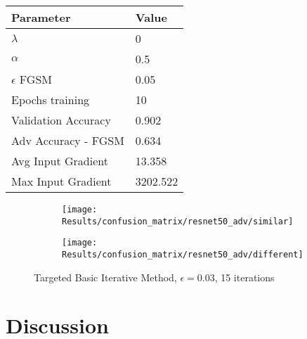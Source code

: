 \documentclass[draft,final]{vutinfth} %
\begin{document}
\begin{table}[h]
  \centering
  \begin{tabular}{ll}
    \toprule
			Parameter			& Value   \\
    \midrule
			$\lambda$								& 0				\\
			$\alpha$								& 0.5				\\
			$\epsilon$ FGSM					& 0.05		\\
			Epochs training					& 10			\\
			
			Validation Accuracy			& 0.902		\\ 
			Adv Accuracy - FGSM			& 0.634		\\
			
			Avg Input Gradient			& 13.358	\\
			Max Input Gradient			& 3202.522\\
    \bottomrule
  \end{tabular}
\end{table}


\begin{figure}[h]
  \begin{subfigure}[b]{0.5\columnwidth}
		\centering
    \texttt{[image: Results/confusion\_matrix/resnet50\_adv/similar]}
    \label{fig:exp:cm:resnet50_gradreg_adv:similar}
  \end{subfigure}
  \begin{subfigure}[b]{0.5\columnwidth}
		\centering
    \texttt{[image: Results/confusion\_matrix/resnet50\_adv/different]}
    \label{fig:exp:cm:resnet50_adv:different}
  \end{subfigure}
  \caption{Targeted Basic Iterative Method, $\epsilon = 0.03$, 15 iterations}
  \label{fig:exp:cm:resnet50_adv}
\end{figure}

\clearpage

\section{Discussion}
\end{document}

